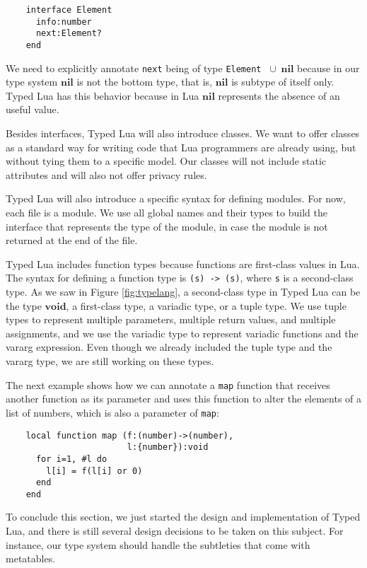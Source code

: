 \documentclass[preprint]{sig-alternate}
\newcommand{\Nil}{\mathbf{nil}}
\newcommand{\Void}{\mathbf{void}}
\begin{document}
\begin{verbatim}
    interface Element
      info:number
      next:Element?
    end
\end{verbatim}

We need to explicitly annotate \texttt{next} being of type
\texttt{Element} $\;\cup\;\Nil$ because in our type system $\Nil$
is not the bottom type, that is, $\Nil$ is subtype of itself only.
Typed Lua has this behavior because in Lua $\Nil$ represents
the absence of an useful value.

Besides interfaces, Typed Lua will also introduce classes.
We want to offer classes as a standard way for writing code that
Lua programmers are already using, but without tying them to a
specific model.
Our classes will not include static attributes and will also not offer
privacy rules.

Typed Lua will also introduce a specific syntax for defining modules.
For now, each file is a module.
We use all global names and their types to build the interface that
represents the type of the module, in case the module is not returned
at the end of the file.

Typed Lua includes function types because functions are first-class
values in Lua.
The syntax for defining a function type is \texttt{(s) -> (s)},
where \texttt{s} is a second-class type.
As we saw in Figure \ref{fig:typelang}, a second-class type in
Typed Lua can be the type $\Void$, a first-class type, a variadic
type, or a tuple type.
We use tuple types to represent multiple parameters, multiple return
values, and multiple assignments, and we use the variadic type to
represent variadic functions and the vararg expression.
Even though we already included the tuple type and the vararg type,
we are still working on these types.

The next example shows how we can annotate a \texttt{map} function
that receives another function as its parameter and uses this
function to alter the elements of a list of numbers, which is
also a parameter of \texttt{map}:
\begin{verbatim}
    local function map (f:(number)->(number),
                        l:{number}):void
      for i=1, #l do
        l[i] = f(l[i] or 0)
      end
    end
\end{verbatim}

To conclude this section, we just started the design and
implementation of Typed Lua, and there is still several design
decisions to be taken on this subject.
For instance, our type system should handle the subtleties that
come with metatables.
\end{document}

